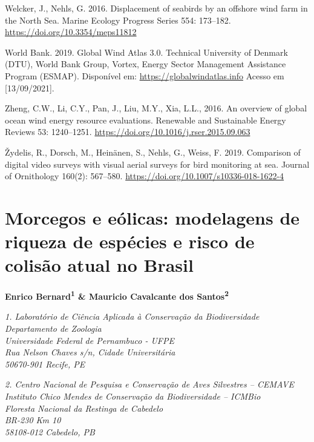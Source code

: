 \documentclass[
  oneside]{scrbook}
\begin{document}
Welcker, J., Nehls, G. 2016. Displacement of seabirds by an offshore wind farm in the North Sea. Marine Ecology Progress Series 554: 173--182. \url{https://doi.org/10.3354/meps11812}

World Bank. 2019. Global Wind Atlas 3.0. Technical University of Denmark (DTU), World Bank Group, Vortex, Energy Sector Management Assistance Program (ESMAP). Disponível em: \url{https://globalwindatlas.info} Acesso em {[}13/09/2021{]}.

Zheng, C.W., Li, C.Y., Pan, J., Liu, M.Y., Xia, L.L., 2016. An overview of global ocean wind energy resource evaluations. Renewable and Sustainable Energy Reviews 53: 1240--1251. \url{https://doi.org/10.1016/j.rser.2015.09.063}

Žydelis, R., Dorsch, M., Heinänen, S., Nehls, G., Weiss, F. 2019. Comparison of digital video surveys with visual aerial surveys for bird monitoring at sea. Journal of Ornithology 160(2): 567--580. \url{https://doi.org/10.1007/s10336-018-1622-4}

\hypertarget{morcegos-e-euxf3licas-modelagens-de-riqueza-de-espuxe9cies-e-risco-de-colisuxe3o-atual-no-brasil}{%
\chapter{Morcegos e eólicas: modelagens de riqueza de espécies e risco de colisão atual no Brasil}\label{morcegos-e-euxf3licas-modelagens-de-riqueza-de-espuxe9cies-e-risco-de-colisuxe3o-atual-no-brasil}}

\pagestyle{headings}

\textbf{Enrico Bernard\textsuperscript{1} \& Mauricio Cavalcante dos Santos\textsuperscript{2}}

\emph{1. Laboratório de Ciência Aplicada à Conservação da Biodiversidade}\\
\emph{Departamento de Zoologia}\\
\emph{Universidade Federal de Pernambuco - UFPE}\\
\emph{Rua Nelson Chaves s/n, Cidade Universitária}\\
\emph{50670-901 Recife, PE}

\emph{2. Centro Nacional de Pesquisa e Conservação de Aves Silvestres -- CEMAVE}\\
\emph{Instituto Chico Mendes de Conservação da Biodiversidade -- ICMBio}\\
\emph{Floresta Nacional da Restinga de Cabedelo}\\
\emph{BR-230 Km 10}\\
\emph{58108-012 Cabedelo, PB}
\end{document}

